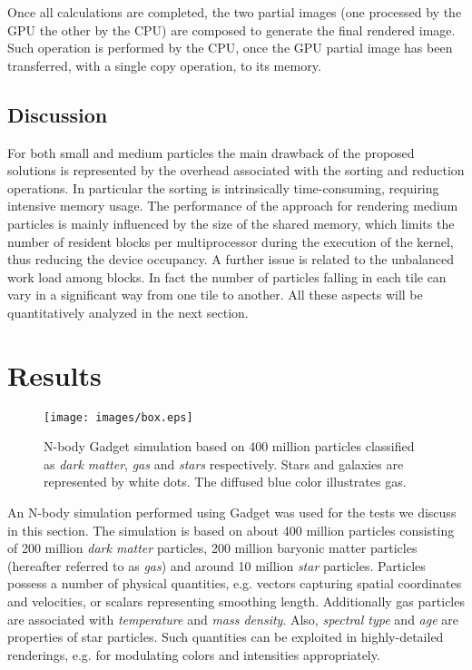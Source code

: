 \documentclass[1p]{elsarticle}
\begin{document}
Once all calculations are completed, the two partial images (one processed by the GPU the other by the CPU) are composed to generate the final rendered image. Such operation is performed by the CPU, once the GPU partial image has been transferred, with a single copy operation, to its memory. 

\subsection{Discussion}
For both small and medium particles the main drawback of the proposed solutions
is represented by the overhead associated with the sorting and reduction operations. In particular the sorting is intrinsically time-consuming, requiring intensive memory usage.
The performance of the approach for rendering medium particles is mainly influenced
by the size of the shared memory, which limits the number of resident blocks
per multiprocessor during the execution of the kernel, thus reducing the device occupancy. 
A further issue is related to the unbalanced work load among blocks. In fact the number of particles falling in each tile can vary in a significant way from one tile to another. All these aspects will be quantitatively analyzed in the next section.

\section{Results}
\label{sec:results}

\begin{figure}
\centering
\texttt{[image: images/box.eps]}
\caption{N-body Gadget simulation based on 400 million particles classified as {\it dark matter}, {\it gas} and {\it stars} respectively. Stars and galaxies are represented by white dots. The diffused blue color illustrates gas.}
\label{fig:box}
\end{figure}

An N-body simulation performed using Gadget \cite{gadgeturl} was used for the tests we discuss in this section. The simulation is based on about 400 million particles consisting of 200 million {\it dark matter} particles, 200 million baryonic matter particles (hereafter referred to as {\it gas}) and around 10 million {\it star} particles. Particles possess a number of physical quantities, e.g. vectors capturing spatial coordinates and velocities, or scalars representing smoothing length. Additionally gas particles are associated with {\it temperature} and {\it mass density}. Also, {\it spectral type} and {\it age} are properties of star particles. Such quantities can be exploited in highly-detailed renderings, e.g. for modulating colors and intensities appropriately. 
\end{document}
